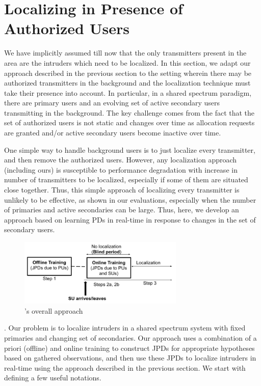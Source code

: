 \section{\texorpdfstring{\ouralgoss}: Localizing in Presence of Authorized Users}
\label{sec:auth}
\label{sec:mtlss}

We have implicitly assumed till now that the only transmitters present
in the area are the intruders which need to be localized.  In this
section, we adapt our \ouralgo approach described in the previous
section to the setting wherein there may be authorized transmitters in
the background and the localization technique must take their presence
into account. In particular, in a shared spectrum paradigm, there are
primary users and an evolving set of active secondary users
transmitting in the background. The key challenge comes from the fact
that the set of authorized users is not static and changes over time
as allocation requests are granted and/or active secondary users
become inactive over time.

One simple way to handle background users is to just localize every
transmitter, and then remove the authorized users. However, any
localization approach (including ours) is susceptible to performance
degradation with increase in number of transmitters to be localized,
especially if some of them are situated close together. Thus, this
simple approach of localizing every transmitter is unlikely to be
effective, as shown in our evaluations, especially when the number of
primaries and active secondaries can be large. Thus, here, we develop
an approach based on learning PDs in real-time in response to changes
in the set of secondary users.

\begin{figure}
	\centering
	\includegraphics[width=0.7\textwidth]{chapters/ipsn/figures/map**2.png}
	\caption{\ouralgoss's overall approach}
	\label{fig:auth}
\end{figure}

. Our problem
is to localize intruders in a shared spectrum system with fixed
primaries and changing set of secondaries.  Our \ouralgoss approach
uses a combination of a priori (offline) and online training to
construct JPDs for appropriate hypotheses based on gathered
observations, and then use these JPDs to localize intruders in
real-time using the \ouralgo approach described in the previous
section. We start with defining a few useful notations.

